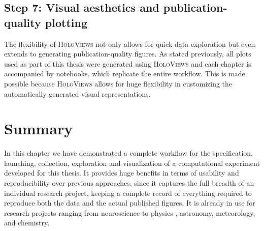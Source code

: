 \subsection{Step 7: Visual aesthetics and publication-quality plotting}

The flexibility of \textsc{HoloViews} not only allows for quick data
exploration but even extends to generating publication-quality
figures. As stated previously, all plots used as part of this thesis
were generated using \textsc{HoloViews} and each chapter is
accompanied by notebooks, which replicate the entire workflow. This is
made possible because \textsc{HoloViews} allows for huge flexibility
in customizing the automatically generated visual representations.

\section{Summary}

In this chapter we have demonstrated a complete workflow for the
specification, launching, collection, exploration and visualization of
a computational experiment developed for this thesis. It provides huge
benefits in terms of usability and reproducibility over previous
approaches, since it captures the full breadth of an individual
research project, keeping a complete record of everything required to
reproduce both the data and the actual published figures.  It is
already in use for research projects ranging from neuroscience
\citep{Keemink2015} to physics \citep{Nijholt2015, Tenner2016},
astronomy, meteorology, and chemistry.
